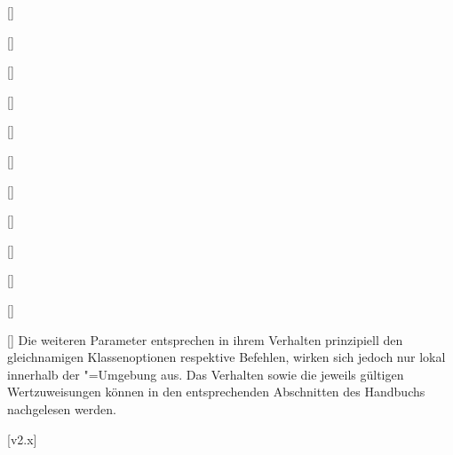 \begin{Declaration}{[]}
\begin{Declaration}{[]}
\begin{Declaration}{[]}
\begin{Declaration}[v2.02]{[\PSet]}
\begin{Declaration}{[\PSet]}{%
}
\begin{Declaration}[v2.03]{[\PSet]}{%
}
\begin{Declaration}[v2.03]{[\PSet]}{%
}
\begin{Declaration}{[]}{%
}
\begin{Declaration}[v2.03]{%
  []
}{}
\begin{Declaration}[v2.02]{[\PSet]}{%
}
\begin{Declaration}[v2.02]{[\PSet]}{%
}
\begin{Declaration}[v2.02]{[\PSet]}{%
}
Die weiteren Parameter entsprechen in ihrem Verhalten prinzipiell den 
gleichnamigen Klassenoptionen respektive Befehlen, wirken sich jedoch nur lokal 
innerhalb der "=Umgebung aus. Das Verhalten sowie die 
jeweils gültigen Wertzuweisungen können in den entsprechenden Abschnitten des 
Handbuchs nachgelesen werden.
\end{Declaration}
\end{Declaration}
\end{Declaration}
\end{Declaration}
\end{Declaration}
\end{Declaration}
\end{Declaration}
\end{Declaration}
\end{Declaration}
\end{Declaration}
\end{Declaration}
\end{Declaration}

[v2.x]


